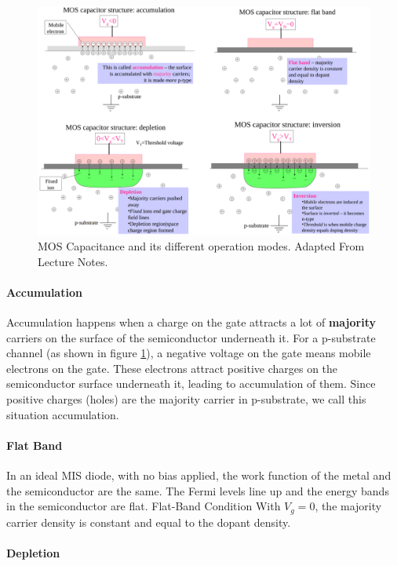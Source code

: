 \begin{figure}[H]
    \centering
    \includegraphics[width=1\linewidth]{../../Figures/MOS_Capacitance.PNG}
    \caption{MOS Capacitance and its different operation modes. Adapted From Lecture Notes.}
    \label{fig:MOS_Capacitance}
\end{figure}

\paragraph{Accumulation}

Accumulation happens when a charge on the gate attracts a lot of \textbf{majority} carriers on the surface of the semiconductor underneath it. For a p-substrate channel (as shown in figure \ref{fig:MOS_Capacitance}), a negative voltage on the gate means mobile electrons on the gate. These electrons attract positive charges on the semiconductor surface underneath it, leading to accumulation of them. Since positive charges (holes) are the majority carrier in p-substrate, we call this situation accumulation. 

\paragraph{Flat Band}

In an ideal MIS diode, with no bias applied, the work function of the metal and the semiconductor are the same. The Fermi levels line up and the energy bands in the semiconductor are flat. Flat-Band Condition
With $V_g = 0$, the majority carrier density is constant and equal to the dopant density.

\paragraph{Depletion}

